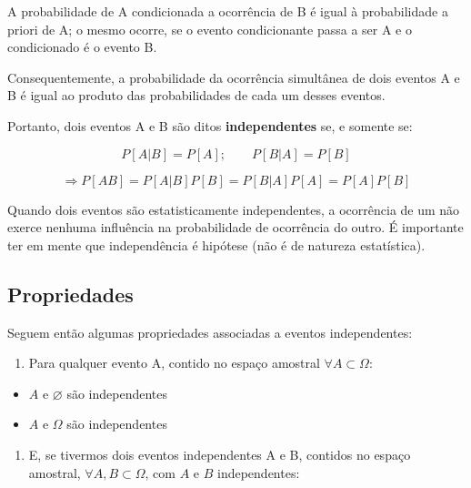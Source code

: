 \documentclass[
]{book}
\providecommand{\tightlist}{%
  \setlength{\itemsep}{0pt}\setlength{\parskip}{0pt}}
\theoremstyle{definition}
\theoremstyle{definition}
\theoremstyle{definition}
\theoremstyle{remark}
\begin{document}
A probabilidade de A condicionada a ocorrência de B é igual à probabilidade a priori de A; o mesmo ocorre, se o evento condicionante passa a ser A e o condicionado é o evento B.

Consequentemente, a probabilidade da ocorrência simultânea de dois eventos A e B é igual ao produto das probabilidades de cada um desses eventos.

Portanto, dois eventos A e B são ditos \textbf{independentes} se, e somente se:

\[P[A|B] = P[A]; \qquad  P[B|A] = P[B]\]

\[\Longrightarrow P[AB] 
  = P[A|B] P[B] = P[B|A] P[A]
  = P[A] P[B]\]

Quando dois eventos são estatisticamente independentes, a ocorrência de um não exerce nenhuma influência na probabilidade de ocorrência do outro. É importante ter em mente que independência é hipótese (não é de natureza estatística).

\hypertarget{propriedades-1}{%
\subsection*{Propriedades}\label{propriedades-1}}

Seguem então algumas propriedades associadas a eventos independentes:

\begin{enumerate}
\def\labelenumi{(\arabic{enumi})}
\tightlist
\item
  Para qualquer evento A, contido no espaço amostral \(\forall A \subset \Omega\):\\
\end{enumerate}

\begin{itemize}
\tightlist
\item
  \(A\) e \(\varnothing\) são independentes\\
\item
  \(A\) e \(\Omega\) são independentes
\end{itemize}

\begin{enumerate}
\def\labelenumi{(\arabic{enumi})}
\setcounter{enumi}{1}
\tightlist
\item
  E, se tivermos dois eventos independentes A e B, contidos no espaço amostral, \(\forall A, B \subset \Omega\), com \(A\) e \(B\) independentes:
\end{enumerate}
\end{document}

